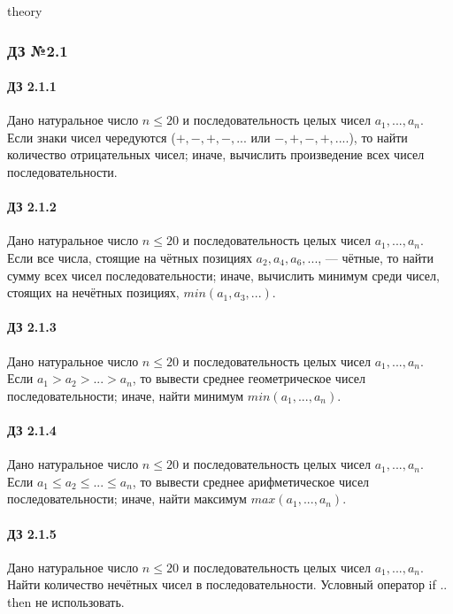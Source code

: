\documentclass[12pt,a4paper]{report}
\begin{document}
\parindent=1cm
\pagestyle{empty}

\lstset{ language=Pascal, basicstyle=\small\ttfamily, numbers=left, numberstyle=\tiny, stepnumber=1, numbersep=5pt, extendedchars=\true, showstringspaces=false, breakatwhitespace=true, frame=single, keepspaces=true }
\clearpage
theory

\clearpage
\clearpage
\subsubsection*{ДЗ №2.1}
\paragraph*{ДЗ 2.1.1} Дано натуральное число $n \le 20$ и последовательность целых чисел $a_1, ..., a_n$. Если знаки чисел чередуются ($+,-,+,-, ...$ или $-,+,-,+, ....$), то найти количество отрицательных чисел; иначе, вычислить произведение всех чисел последовательности.
\paragraph*{ДЗ 2.1.2} Дано натуральное число $n \le 20$ и последовательность целых чисел $a_1, ..., a_n$. Если все числа, стоящие на чётных позициях $a_2, a_4, a_6, ...$, --- чётные, то найти сумму всех чисел последовательности; иначе, вычислить минимум среди чисел, стоящих на нечётных позициях, $min(a_1, a_3, ...)$.
\paragraph*{ДЗ 2.1.3} Дано натуральное число $n \le 20$ и последовательность целых чисел $a_1, ..., a_n$. Если $a_1 > a_2 > ... > a_n$, то вывести среднее геометрическое чисел последовательности; иначе, найти минимум $min(a_1, ..., a_n)$.
\paragraph*{ДЗ 2.1.4} Дано натуральное число $n \le 20$ и последовательность целых чисел $a_1, ..., a_n$. Если $a_1 \le a_2 \le ... \le a_n$, то вывести среднее арифметическое чисел последовательности; иначе, найти максимум $max(a_1, ..., a_n)$.
\paragraph*{ДЗ 2.1.5} Дано натуральное число $n \le 20$ и последовательность целых чисел $a_1, ..., a_n$. Найти количество нечётных чисел в последовательности. Условный оператор if .. then не использовать.
\end{document}

